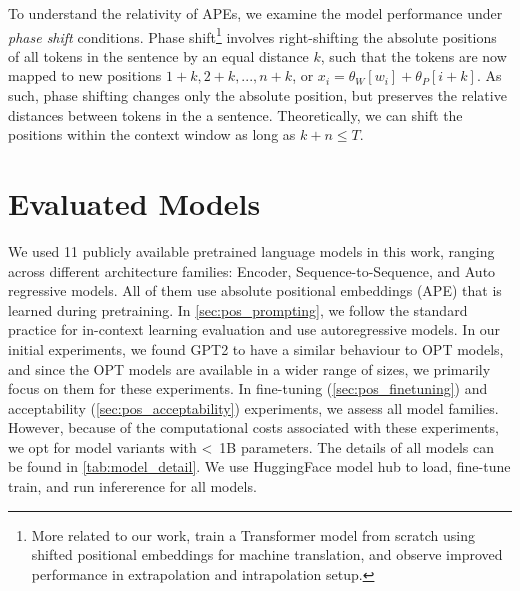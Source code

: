 \documentclass[letterpaper, 12pt]{report}
\begin{document}
To understand the relativity of APEs, we examine the model performance under \textit{phase shift} conditions.
Phase shift\footnote{More related to our work, \citet{kiyono2021} train a Transformer model from scratch using shifted positional embeddings for machine translation, and observe improved performance in extrapolation and intrapolation setup.} involves right-shifting the absolute positions of all tokens in the sentence by an equal distance $k$, such that the tokens are now mapped to new positions $1+k, 2+k, ... , n+k$, or $x_i = \theta_{W}[w_i] + \theta_{P}[i+k]$.
As such, phase shifting changes only the absolute position, but preserves the relative distances between tokens in the a sentence.
Theoretically, we can shift the positions within the context window as long as $k+n \leq T$. %

\section{Evaluated Models}
\label{sec:pos_evaluated_models}


We used 11 publicly available pretrained language models in this work, ranging across different architecture families: Encoder, Sequence-to-Sequence, and Auto regressive models. All of them use absolute positional embeddings (APE) that is learned during pretraining. In \autoref{sec:pos_prompting}, we follow the standard practice for in-context learning evaluation \citep{Brown2020:GPT3,Black2022:GPTNeoX, lm-eval-harness} and use autoregressive models. In our initial experiments, we found GPT2 to have a similar behaviour to OPT models, and since the OPT models are available in a wider range of sizes, we primarily focus on them for these experiments.
In fine-tuning (\autoref{sec:pos_finetuning}) and acceptability (\autoref{sec:pos_acceptability}) experiments, we assess all model families. However, because of the computational costs associated with these experiments, we opt for model variants with \textless~1B parameters. The details of all models can be found in \autoref{tab:model_detail}. We use HuggingFace \citep{huggingface} model hub to load, fine-tune train, and run infererence for all models.



\end{document}
